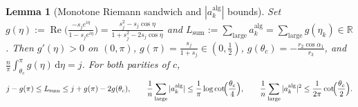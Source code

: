 \documentclass[10pt]{article}
\numberwithin{equation}{section}
\theoremstyle{plain}
\newtheorem{lemma}[theorem]{Lemma}
\theoremstyle{definition}
\newcommand{\dd}{\mathrm{d}}
\newcommand{\R}{\mathbb{R}}
\newcommand{\1}{\mathbf{1}}
\DeclareMathOperator{\re}{Re}
\begin{document}
\begin{lemma}[Monotone Riemann sandwich and $|a_k^{\mathrm{alg}}|$ bounds]\label{lem:riemann}
Set $g(\eta) := \re\bigl(\frac{-s_j e^{i\eta}}{1 - s_j e^{i\eta}}\bigr) = \frac{s_j^2 - s_j\cos\eta}{1 + s_j^2 - 2s_j\cos\eta}$ and $L_{\mathrm{sum}} := \sum_{\mathrm{large}} a_k^{\mathrm{alg}} = \sum_{\mathrm{large}} g(\eta_k) \in \R$. Then $g'(\eta) > 0$ on $(0, \pi)$, $g(\pi) = \frac{s_j}{1 + s_j} \in (0, \frac{1}{2})$, $g(\theta_c) = -\frac{r_2\cos\alpha_1}{r_3}$, and $\frac{n}{\pi}\int_{\theta_c}^\pi g(\eta)\,\dd\eta = j$. For both parities of $c$,
\[
j - g(\pi) \le L_{\mathrm{sum}} \le j + g(\pi) - 2 g(\theta_c),
\qquad
\frac{1}{n}\sum_{\mathrm{large}} |a_k^{\mathrm{alg}}| \le \frac{1}{\pi}\log\cot\!\Bigl(\frac{\theta_c}{4}\Bigr),
\qquad
\frac{1}{n}\sum_{\mathrm{large}} |a_k^{\mathrm{alg}}|^2 \le \frac{1}{2\pi}\cot\!\Bigl(\frac{\theta_c}{2}\Bigr).
\]
\end{lemma}
\end{document}
